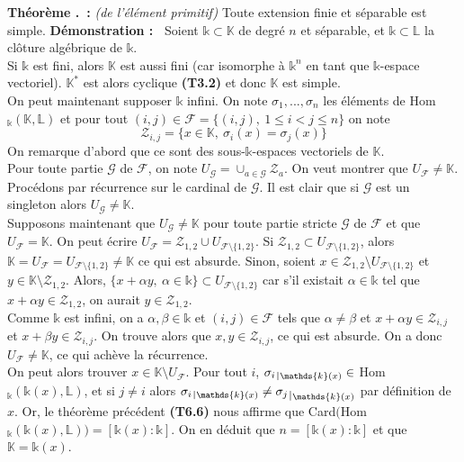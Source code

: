 \documentclass[5pt,a4paper]{article}
\newcounter{thm}[section]
\renewcommand{\thethm}{\thesection.\arabic{thm}}
\newcommand{\thm}[1]{\stepcounter{thm}\noindent\textbf{Théorème \thethm ~:} #1 \newline}
\newcommand{\demo}[1]{\textbf{Démonstration :~} #1 \newline}
\def\restriction#1#2{\mathchoice
              {\setbox1\hbox{${\displaystyle #1}_{\scriptstyle #2}$}
              \restrictionaux{#1}{#2}}
              {\setbox1\hbox{${\textstyle #1}_{\scriptstyle #2}$}
              \restrictionaux{#1}{#2}}
              {\setbox1\hbox{${\scriptstyle #1}_{\scriptscriptstyle #2}$}
              \restrictionaux{#1}{#2}}
              {\setbox1\hbox{${\scriptscriptstyle #1}_{\scriptscriptstyle #2}$}
              \restrictionaux{#1}{#2}}}
\def\restrictionaux#1#2{{#1\,\smash{\vrule height .8\ht1 depth .85\dp1}}_{\,#2}}
\begin{document}
\begin{onehalfspacing}
\thm{\textit{(de l'élément primitif)} Toute extension finie et séparable est simple.}
\demo{Soient $\mathds{k} \subset \mathbb{K}$ de degré $n$ et séparable, et $\mathds{k} \subset \mathbb{L}$ la clôture algébrique de $\mathds{k}$. 
\\Si $\mathds{k}$ est fini, alors $\mathbb{K}$ est aussi fini (car isomorphe à $\mathds{k}^n$ en tant que $\mathds{k}$-espace vectoriel). $\mathbb{K}^*$ est alors cyclique \textbf{(T3.2)} et donc $\mathbb{K}$ est simple. 
\\On peut maintenant supposer $\mathds{k}$ infini. On note $\sigma_1, ..., \sigma_n$ les éléments de Hom$_{\mathds{k}}(\mathbb{K}, \mathbb{L})$ et pour tout $(i,j) \in \mathcal{F} = \{(i,j),~1 \leq i < j \leq n\}$ on note 
\[ \mathcal{Z}_{i,j} = \{x \in \mathbb{K},~\sigma_i(x) = \sigma_j(x)\}\]
On remarque d'abord que ce sont des sous-$\mathds{k}$-espaces vectoriels de $\mathbb{K}$. 
\\Pour toute partie $\mathcal{G}$ de $\mathcal{F}$, on note $U_\mathcal{G} = \cup_{a \in \mathcal{G}} \mathcal{Z}_a$. On veut montrer que $U_\mathcal{F} \neq \mathbb{K}$. Procédons par récurrence sur le cardinal de $\mathcal{G}$. Il est clair que si $\mathcal{G}$ est un singleton alors $U_\mathcal{G} \neq \mathbb{K}$. 
\\Supposons maintenant que $U_\mathcal{G} \neq \mathbb{K}$ pour toute partie stricte $\mathcal{G}$ de $\mathcal{F}$ et que $U_\mathcal{F} = \mathbb{K}$. On peut écrire $U_\mathcal{F} = \mathcal{Z}_{1, 2} \cup U_{\mathcal{F} \setminus \{1, 2\}}$. Si $\mathcal{Z}_{1, 2} \subset U_{\mathcal{F} \setminus \{1, 2\}}$, alors $\mathbb{K} = U_\mathcal{F} = U_{\mathcal{F} \setminus \{1, 2\}} \neq \mathbb{K}$ ce qui est absurde. Sinon, soient $x \in \mathcal{Z}_{1, 2} \setminus U_{\mathcal{F} \setminus \{1, 2\}}$ et $y \in \mathbb{K} \setminus \mathcal{Z}_{1, 2}$. Alors, $\{x + \alpha y,~\alpha \in \mathds{k}\} \subset U_{\mathcal{F} \setminus \{1, 2\}}$ car s'il existait $\alpha \in \mathds{k}$ tel que $x + \alpha y \in \mathcal{Z}_{1,2}$, on aurait $y \in \mathcal{Z}_{1, 2}$. 
\\Comme $\mathds{k}$ est infini, on a $\alpha, \beta \in \mathds{k}$ et $(i, j) \in \mathcal{F}$ tels que $\alpha \neq \beta$ et $x + \alpha y \in \mathcal{Z}_{i, j}$ et $x + \beta y \in \mathcal{Z}_{i, j}$. On trouve alors que $x, y \in \mathcal{Z}_{i, j}$, ce qui est absurde. On a donc $U_\mathcal{F} \neq \mathbb{K}$, ce qui achève la récurrence. 
\\On peut alors trouver $x \in \mathbb{K} \setminus U_\mathcal{F}$. Pour tout $i$, $\restriction{\sigma_i}{\mathds{k}(x)} \in $ Hom$_{\mathds{k}}(\mathds{k}(x), \mathbb{L})$, et si $j \neq i$ alors $\restriction{\sigma_i}{\mathds{k}(x)} \neq \restriction{\sigma_j}{\mathds{k}(x)}$ par définition de $x$. Or, le théorème précédent \textbf{(T6.6)} nous affirme que Card$($Hom$_{\mathds{k}}(\mathds{k}(x), \mathbb{L})) = [\mathds{k}(x) : \mathds{k}]$. On en déduit que $n = [\mathds{k}(x) : \mathds{k}]$ et que $\mathbb{K} = \mathds{k}(x)$.}



\end{onehalfspacing}
\end{document}
